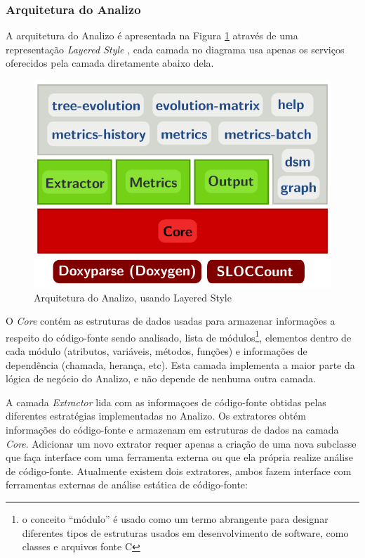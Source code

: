 \subsubsection{Arquitetura do Analizo}

A arquitetura do Analizo é apresentada na Figura \ref{arquitetura-analizo}
através de uma representação {\it Layered Style} \cite{Clements2002}, cada
camada no diagrama usa apenas os serviços oferecidos pela camada diretamente
abaixo dela.

\begin{figure}[h]
\center
\includegraphics[scale=0.3]{imagens/analizo-architecture.png}
\caption{Arquitetura do Analizo, usando Layered Style \cite{Clements2002}}
\label{arquitetura-analizo}
\end{figure}

O {\it Core} contém as estruturas de dados usadas para armazenar informações a
respeito do código-fonte sendo analisado, lista de módulos\footnote{o
conceito ``módulo'' é usado como um termo abrangente para designar diferentes
tipos de estruturas usados em desenvolvimento de software, como classes e
arquivos fonte C}, elementos dentro de cada módulo (atributos, variáveis,
métodos, funções) e informações de dependência (chamada, herança, etc). Esta
camada implementa a maior parte da lógica de negócio do Analizo, e não depende
de nenhuma outra camada.

A camada {\it Extractor} lida com as informaçoes de código-fonte obtidas pelas
diferentes estratégias implementadas no Analizo. Os extratores obtém
informações do código-fonte e armazenam em estruturas de dados na camada {\it
Core}. Adicionar um novo extrator requer apenas a criação de uma nova subclasse
que faça interface com uma ferramenta externa ou que ela própria realize análise
de código-fonte. Atualmente existem dois extratores, ambos fazem interface
com ferramentas externas de análise estática de código-fonte:

